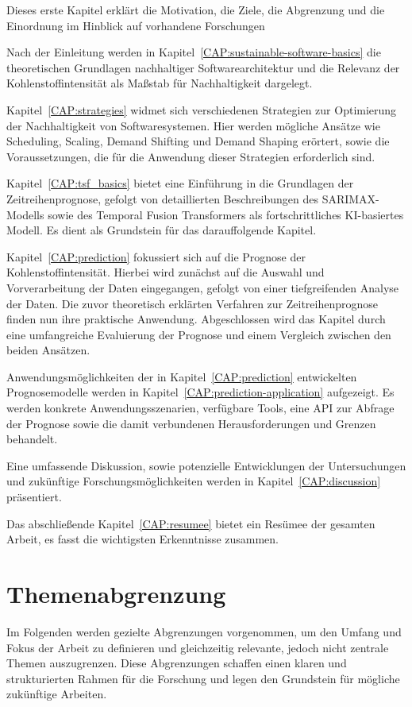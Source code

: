 Dieses erste Kapitel erklärt die Motivation, die Ziele, die Abgrenzung und die Einordnung im Hinblick auf vorhandene Forschungen

Nach der Einleitung werden in Kapitel~\ref{CAP:sustainable-software-basics} die theoretischen Grundlagen nachhaltiger Softwarearchitektur und die Relevanz der Kohlenstoffintensität als Maßstab für Nachhaltigkeit dargelegt.

Kapitel~\ref{CAP:strategies} widmet sich verschiedenen Strategien zur Optimierung der Nachhaltigkeit von Softwaresystemen.
Hier werden mögliche Ansätze wie Scheduling, Scaling, Demand Shifting und Demand Shaping erörtert, sowie die Voraussetzungen, die für die Anwendung dieser Strategien erforderlich sind.

Kapitel~\ref{CAP:tsf_basics} bietet eine Einführung in die Grundlagen der Zeitreihenprognose, gefolgt von detaillierten Beschreibungen des SARIMAX-Modells sowie des Temporal Fusion Transformers als fortschrittliches KI-basiertes Modell.
Es dient als Grundstein für das darauffolgende Kapitel.

Kapitel~\ref{CAP:prediction} fokussiert sich auf die Prognose der Kohlenstoffintensität.
Hierbei wird zunächst auf die Auswahl und Vorverarbeitung der Daten eingegangen, gefolgt von einer tiefgreifenden Analyse der Daten.
Die zuvor theoretisch erklärten Verfahren zur Zeitreihenprognose finden nun ihre praktische Anwendung.
Abgeschlossen wird das Kapitel durch eine umfangreiche Evaluierung der Prognose und einem Vergleich zwischen den beiden Ansätzen.

Anwendungsmöglichkeiten der in Kapitel~\ref{CAP:prediction} entwickelten Prognosemodelle werden in Kapitel~\ref{CAP:prediction-application} aufgezeigt.
Es werden konkrete Anwendungsszenarien, verfügbare Tools, eine API zur Abfrage der Prognose sowie die damit verbundenen Herausforderungen und Grenzen behandelt.

Eine umfassende Diskussion, sowie potenzielle Entwicklungen der Untersuchungen und zukünftige Forschungsmöglichkeiten werden in Kapitel~\ref{CAP:discussion} präsentiert.

Das abschließende Kapitel~\ref{CAP:resumee} bietet ein Resümee der gesamten Arbeit, es fasst die wichtigsten Erkenntnisse zusammen.

\section{Themenabgrenzung}
Im Folgenden werden gezielte Abgrenzungen vorgenommen, um den Umfang und Fokus der Arbeit zu definieren und gleichzeitig relevante, jedoch nicht zentrale Themen auszugrenzen.
Diese Abgrenzungen schaffen einen klaren und strukturierten Rahmen für die Forschung und legen den Grundstein für mögliche zukünftige Arbeiten.

